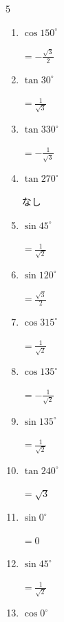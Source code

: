 \begin{multicols}{5}
\begin{enumerate}
        $\displaystyle =-\frac{1}{2}$

  \item $\displaystyle \cos{150^\circ}$

        $\displaystyle =-\frac{\sqrt{3}}{2}$

  \item $\displaystyle \tan{30^\circ}$

        $\displaystyle =\frac{1}{\sqrt{3}}$

  \item $\displaystyle \tan{330^\circ}$

        $\displaystyle =-\frac{1}{\sqrt{3}}$

  \item $\displaystyle \tan{270^\circ}$

        $\displaystyle なし$

  \item $\displaystyle \sin{45^\circ}$

        $\displaystyle =\frac{1}{\sqrt{2}}$

  \item $\displaystyle \sin{120^\circ}$

        $\displaystyle =\frac{\sqrt{3}}{2}$

  \item $\displaystyle \cos{315^\circ}$

        $\displaystyle =\frac{1}{\sqrt{2}}$

  \item $\displaystyle \cos{135^\circ}$

        $\displaystyle =-\frac{1}{\sqrt{2}}$

  \item $\displaystyle \sin{135^\circ}$

        $\displaystyle =\frac{1}{\sqrt{2}}$

  \item $\displaystyle \tan{240^\circ}$

        $\displaystyle =\sqrt{3}$

  \item $\displaystyle \sin{0^\circ}$

        $\displaystyle =0$

  \item $\displaystyle \sin{45^\circ}$

        $\displaystyle =\frac{1}{\sqrt{2}}$

\columnbreak %

  \item $\displaystyle \cos{0^\circ}$


\end{enumerate}
\end{multicols}
